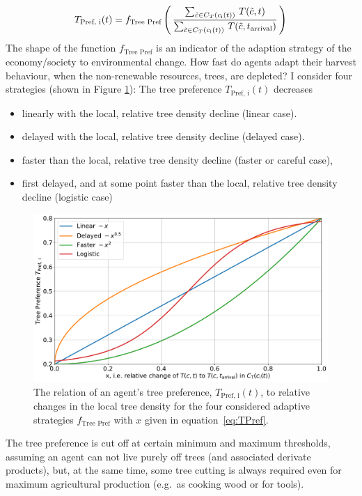 \begin{equation}\label{eq:TPref}
T_\text{Pref, i}(t) = f_\text{Tree Pref}\left( \, \frac{\sum_{\tilde{c} \in C_{T}(c_{\rm i}(t)) } \, T(\tilde{c}, t)}{\sum_{\tilde{c} \in C_{T}(c_{\rm i}(t))} \, T(\tilde{c}, t_\text{arrival}) } \, \right)
\end{equation}
The shape of the function $f_\text{Tree Pref}$ is an indicator of the adaption strategy of the economy/society to environmental change. How fast do agents adapt their harvest behaviour, when the non-renewable resources, trees, are depleted?
I consider four strategies (shown in Figure \ref{fig:TPref_T}): The tree preference $T_\text{Pref, i}(t)$ decreases
\begin{itemize}
	\item linearly with the local, relative tree density decline (linear case).  
	\item delayed with the local, relative tree density decline (delayed case).
	\item faster than the local, relative tree density decline (faster or careful case),
	\item first delayed, and at some point faster than the local, relative tree density decline (logistic case) 
\end{itemize}
\begin{figure}
	\centering
	\includegraphics[width=\textwidth]{images/TPref}
	\caption{The relation of an agent's tree preference, $T_\text{Pref, i}(t)$, to relative changes in the local tree density for the four considered adaptive strategies $f_\text{Tree Pref}$ with $x$ given in equation~\ref{eq:TPref}.}
	\label{fig:TPref_T}
\end{figure}
The tree preference is cut off at certain minimum and maximum thresholds, assuming an agent can not live purely off trees (and associated derivate products), but, at the same time, some tree cutting is always required even for maximum agricultural production (e.g.\ as cooking wood or for tools). 
